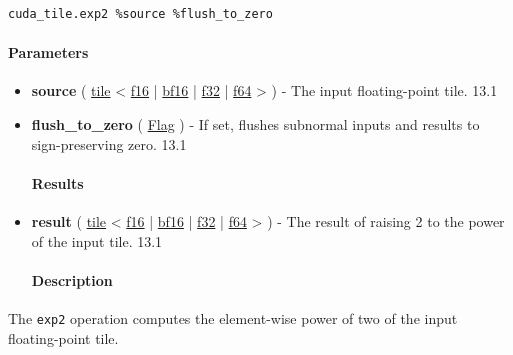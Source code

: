 \documentclass{article}
\begin{document}
\begin{lstlisting}
cuda_tile.exp2 %source %flush_to_zero
\end{lstlisting}

\paragraph{Parameters}

\begin{itemize}
\item \textbf{source} ( \href{https://docs.nvidia.com/cuda/tile-ir/latest/sections/types.html#type-tile}{tile} < \href{https://docs.nvidia.com/cuda/tile-ir/latest/sections/types.html#subsection-element-types}{f16} | \href{https://docs.nvidia.com/cuda/tile-ir/latest/sections/types.html#subsection-element-types}{bf16} | \href{https://docs.nvidia.com/cuda/tile-ir/latest/sections/types.html#subsection-element-types}{f32} | \href{https://docs.nvidia.com/cuda/tile-ir/latest/sections/types.html#subsection-element-types}{f64} > ) - The input floating-point tile. 13.1
\item \textbf{flush\_to\_zero} ( \href{https://docs.nvidia.com/cuda/tile-ir/latest/sections/operations.html#type-flag}{Flag} ) - If set, flushes subnormal inputs and results to sign-preserving zero. 13.1


\paragraph{Results}

\item \textbf{result} ( \href{https://docs.nvidia.com/cuda/tile-ir/latest/sections/types.html#type-tile}{tile} < \href{https://docs.nvidia.com/cuda/tile-ir/latest/sections/types.html#subsection-element-types}{f16} | \href{https://docs.nvidia.com/cuda/tile-ir/latest/sections/types.html#subsection-element-types}{bf16} | \href{https://docs.nvidia.com/cuda/tile-ir/latest/sections/types.html#subsection-element-types}{f32} | \href{https://docs.nvidia.com/cuda/tile-ir/latest/sections/types.html#subsection-element-types}{f64} > ) - The result of raising 2 to the power of the input tile. 13.1


\paragraph{Description}

\end{itemize}
The \texttt{exp2} operation computes the element-wise power of two of the input floating-point tile.
\end{document}
